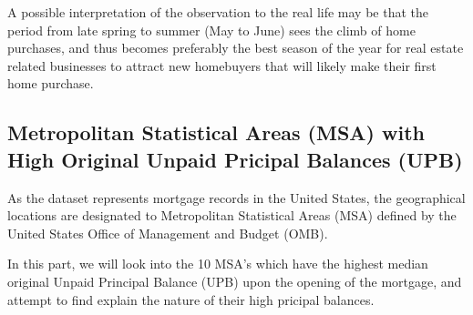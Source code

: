 \documentclass[11pt]{article}
\begin{document}
A possible interpretation of the observation to the real life may be
that the period from late spring to summer (May to June) sees the climb
of home purchases, and thus becomes preferably the best season of the
year for real estate related businesses to attract new homebuyers that
will likely make their first home purchase.

    \hypertarget{metropolitan-statistical-areas-msa-with-high-original-unpaid-pricipal-balances-upb}{%
\subsection{Metropolitan Statistical Areas (MSA) with High Original
Unpaid Pricipal Balances
(UPB)}\label{metropolitan-statistical-areas-msa-with-high-original-unpaid-pricipal-balances-upb}}

As the dataset represents mortgage records in the United States, the
geographical locations are designated to Metropolitan Statistical Areas
(MSA) defined by the United States Office of Management and Budget
(OMB).

In this part, we will look into the 10 MSA's which have the highest
median original Unpaid Principal Balance (UPB) upon the opening of the
mortgage, and attempt to find explain the nature of their high pricipal
balances.
\end{document}
